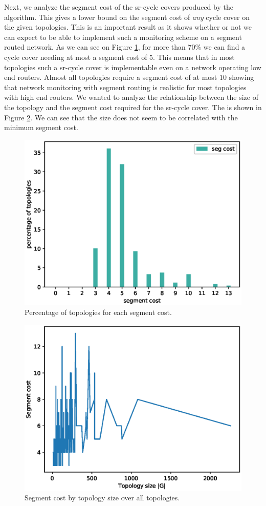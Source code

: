 Next, we analyze the segment cost of the sr-cycle covers produced by the algorithm. This gives a lower bound
on the segment cost of \emph{any} cycle cover on the given topologies. This is an important result as it shows
whether or not we can expect to be able to implement such a monitoring scheme on a segment routed network. As
we can see on Figure \ref{fig:min-seg-cover-segcost}, for more than $70\%$ we can find a cycle cover needing
at most a segment cost of $5$. This means that in most topologies such a sr-cycle cover is implementable even
on a network operating low end routers. Almost all topologies require a segment cost of at most $10$ showing
that network monitoring with segment routing is realistic for most topologies with high end routers. We wanted
to analyze the relationship between the size of the topology and the segment cost required for the sr-cycle cover.
The is shown in Figure \ref{fig:min-seg-cover-segcost-size}. We can see that the size does not seem to be 
correlated with the minimum segment cost.

\begin{figure}
\begin{center}
\includegraphics[width=.85\columnwidth]{./Network-lib/data/plot/minSegCover_segcost.eps}
\end{center}
\caption{Percentage of topologies for each segment cost.}
\label{fig:min-seg-cover-segcost}
\end{figure}


\begin{figure}
\begin{center}
\includegraphics[width=.85\columnwidth]{./Network-lib/data/plot/minSegCover_segcost_by_size.eps}
\end{center}
\caption{Segment cost by topology size over all topologies.}
\label{fig:min-seg-cover-segcost-size}
\end{figure}
